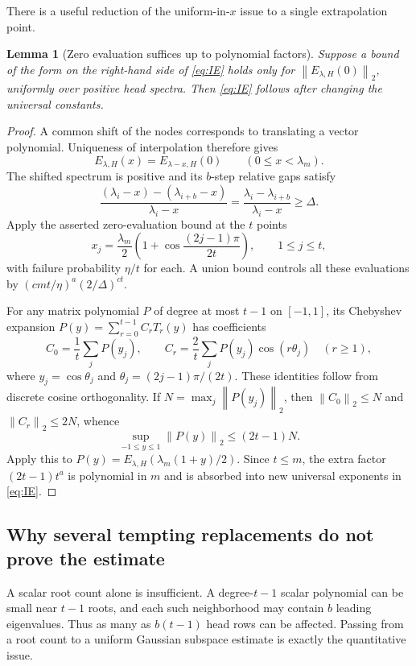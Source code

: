 \documentclass[11pt]{article}
\newtheorem{lemma}[theorem]{Lemma}
\theoremstyle{definition}
\newcommand{\norm}[1]{\left\lVert #1\right\rVert}
\begin{document}
There is a useful reduction of the uniform-in-$x$ issue to a single
extrapolation point.

\begin{lemma}[Zero evaluation suffices up to polynomial factors]
\label{lem:zero-eval}
Suppose a bound of the form on the right-hand side of \eqref{eq:IE} holds
only for $\norm{E_{\lambda,H}(0)}_2$, uniformly over positive head spectra.
Then \eqref{eq:IE} follows after changing the universal constants.
\end{lemma}
\begin{proof}
A common shift of the nodes corresponds to translating a vector polynomial.
Uniqueness of interpolation therefore gives
\[
 E_{\lambda,H}(x)=E_{\lambda-x,H}(0)
 \qquad(0\leq x<\lambda_m).
\]
The shifted spectrum is positive and its $b$-step relative gaps satisfy
\[
 \frac{(\lambda_i-x)-(\lambda_{i+b}-x)}{\lambda_i-x}
 =\frac{\lambda_i-\lambda_{i+b}}{\lambda_i-x}\geq\Delta.
\]
Apply the asserted zero-evaluation bound at the $t$ points
\[
 x_j=\frac{\lambda_m}{2}
       \left(1+\cos\frac{(2j-1)\pi}{2t}\right),\qquad1\leq j\leq t,
\]
with failure probability $\eta/t$ for each. A union bound controls all
these evaluations by
$(cmt/\eta)^a(2/\Delta)^{ct}$.

For any matrix polynomial $P$ of degree at most $t-1$ on $[-1,1]$, its
Chebyshev expansion $P(y)=\sum_{r=0}^{t-1}C_rT_r(y)$ has coefficients
\[
 C_0=\frac1t\sum_jP(y_j),\qquad
 C_r=\frac2t\sum_jP(y_j)\cos(r\theta_j)\quad(r\geq1),
\]
where $y_j=\cos\theta_j$ and $\theta_j=(2j-1)\pi/(2t)$.
These identities follow from discrete cosine orthogonality. If
$N=\max_j\norm{P(y_j)}_2$, then
$\norm{C_0}_2\leq N$ and $\norm{C_r}_2\leq2N$, whence
\[
 \sup_{-1\leq y\leq1}\norm{P(y)}_2\leq(2t-1)N.
\]
Apply this to $P(y)=E_{\lambda,H}(\lambda_m(1+y)/2)$. Since $t\leq m$,
the extra factor $(2t-1)t^a$ is polynomial in $m$ and is absorbed into
new universal exponents in \eqref{eq:IE}.
\end{proof}

\subsection{Why several tempting replacements do not prove the estimate}

A scalar root count alone is insufficient. A degree-$t-1$ scalar polynomial
can be small near $t-1$ roots, and each such neighborhood may contain $b$
leading eigenvalues. Thus as many as $b(t-1)$ head rows can be affected.
Passing from a root count to a uniform Gaussian subspace estimate is exactly
the quantitative issue.
\end{document}
